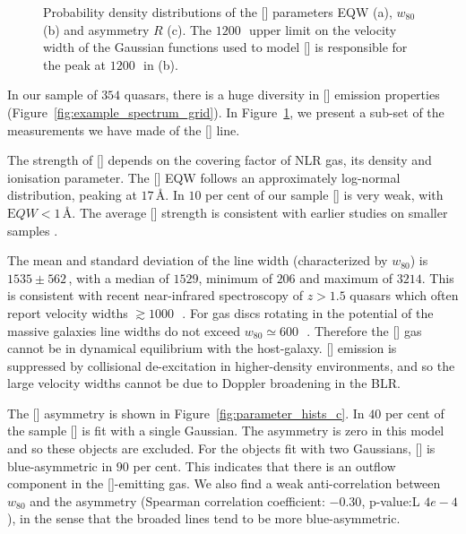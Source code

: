 \begin{figure}
    \caption[{Probability density distributions of the [] parameters EQW (a), $w_{80}$ (b) and asymmetry $R$ (c).}]{Probability density distributions of the [] parameters EQW (a), $w_{80}$ (b) and asymmetry $R$ (c). The $1200$\,\kms\, upper limit on the velocity width of the Gaussian functions used to model [] is responsible for the peak at $1200$\,\kms\, in (b).}     
    \label{fig:parameter_hists}
\end{figure}

In our sample of $354$ quasars, there is a huge diversity in [] emission properties (Figure~\ref{fig:example_spectrum_grid}). 
In Figure~\ref{fig:parameter_hists}, we present a sub-set of the measurements we have made of the [] line.  

The strength of [] depends on the covering factor of NLR gas, its density and ionisation parameter. 
The [] EQW follows an approximately log-normal distribution, peaking at $17$\,\AA. 
In $10$ per cent of our sample [] is very weak, with ${\mathrm EQW} < 1$\,\AA.  
The average [] strength is consistent with earlier studies on smaller samples \citep[e.g.][]{sulentic04,netzer04,shen16a}.

The mean and standard deviation of the line width (characterized by $w_{80}$) is $1535\pm562$\,\kms, with a median of $1529$, minimum of $206$ and maximum of $3214$. 
This is consistent with recent near-infrared spectroscopy of $z>1.5$ quasars which often report velocity widths $\gtrsim1000$\,\kms\, \citep[e.g.][]{netzer04,kim13,brusa15,shen16a}. 
For gas discs rotating in the potential of the massive galaxies line widths do not exceed $w_{80}\simeq600$\,\kms\, \citep{liu13}. 
Therefore the [] gas cannot be in dynamical equilibrium with the host-galaxy. 
[] emission is suppressed by collisional de-excitation in higher-density environments, and so the large velocity widths cannot be due to Doppler broadening in the BLR. 

The [] asymmetry is shown in Figure~\ref{fig:parameter_hists_c}. 
In $40$ per cent of the sample [] is fit with a single Gaussian. 
The asymmetry is zero in this model and so these objects are excluded. 
For the objects fit with two Gaussians, [] is blue-asymmetric in $90$ per cent. 
This indicates that there is an outflow component in the []-emitting gas. 
We also find a weak anti-correlation between $w_{80}$ and the asymmetry (Spearman correlation coefficient: $-0.30$, p-value:L $4e-4$), in the sense that the broaded lines tend to be more blue-asymmetric.  

